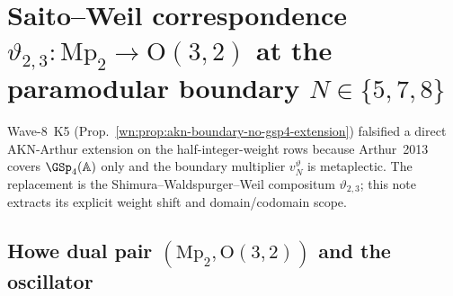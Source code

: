 %

\providecommand{\Mp}{\mathrm{Mp}}
\providecommand{\Sp}{\mathrm{Sp}}
\providecommand{\SL}{\mathrm{SL}}
\providecommand{\GSpin}{\mathrm{GSpin}}
\providecommand{\PGSp}{\mathrm{PGSp}}
\providecommand{\Oo}{\mathrm{O}}
\providecommand{\SO}{\mathrm{SO}}
\providecommand{\A}{\mathbb{A}}
\providecommand{\R}{\mathbb{R}}
\providecommand{\Z}{\mathbb{Z}}
\providecommand{\Q}{\mathbb{Q}}
\providecommand{\kBKM}{\kappa_{\mathrm{BKM}}}
\providecommand{\kch}{\kappa_{\mathrm{ch}}}
\providecommand{\cA}{\mathcal{A}}
\providecommand{\cS}{\mathcal{S}}
\providecommand{\fg}{\mathfrak{g}}
\providecommand{\theta}{\vartheta}
\providecommand{\ClaimStatusTheorem}{\textsc{[Theorem]}}
\providecommand{\ClaimStatusConjectured}{\textsc{[Conjectured]}}

\section{Saito--Weil correspondence $\theta_{2,3}: \Mp_2 \to \Oo(3,2)$
at the paramodular boundary $N \in \{5, 7, 8\}$}
\label{wn:sec:saito-weil-theta-23-boundary}

Wave-8~K5 (Prop.~\ref{wn:prop:akn-boundary-no-gsp4-extension})
falsified a direct AKN-Arthur extension on the half-integer-weight rows
because Arthur~2013 covers $\GSp_4(\A)$ only and the boundary multiplier
$v^{\theta}_N$ is metaplectic.  The replacement is the
Shimura--Waldspurger--Weil compositum $\theta_{2,3}$; this note extracts
its explicit weight shift and domain/codomain scope.

\subsection{Howe dual pair $(\Mp_2, \Oo(3,2))$ and the oscillator}

